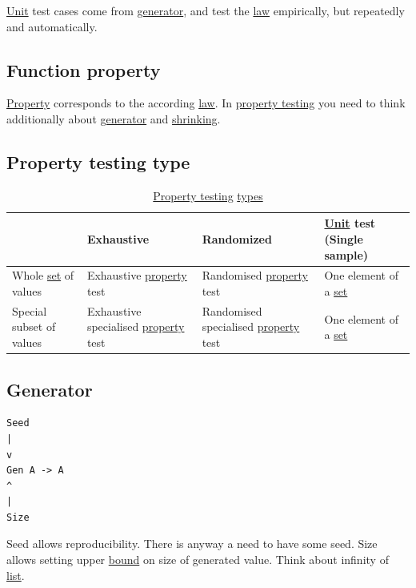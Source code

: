 \documentclass[a4paper,14pt,oneside]{book}
\begin{document}
\hyperref[org0016cda]{Unit} test cases come from \hyperref[org29306eb]{generator}, and test the \hyperref[org0354a37]{law} empirically, but repeatedly and automatically.

\subsection{\label{org5432163}Function property}
\label{sec:orgd51fe79}

\hyperref[orgbfedd9a]{Property} corresponds to the according \hyperref[org0354a37]{law}.
In \hyperref[org741dbd3]{property testing} you need to think additionally about \hyperref[org29306eb]{generator} and \hyperref[orgfdb0c80]{shrinking}.

\subsection{\label{org6c72ebe}Property testing type}
\label{sec:orgda78947}

\begin{table}[htbp]
\caption{\label{tab--property-testing-type}\hyperref[org741dbd3]{Property testing} \hyperref[orgc4edbaa]{types}}
\centering
\begin{tabu} spread \linewidth {llll}
\toprule
 & Exhaustive & Randomized & \hyperref[org0016cda]{Unit} test (Single sample)\\
\midrule
Whole \hyperref[org8d6310c]{set} of values & Exhaustive \hyperref[orgbfedd9a]{property} test & Randomised \hyperref[orgbfedd9a]{property} test & One element of a \hyperref[org8d6310c]{set}\\
Special subset of values & Exhaustive specialised \hyperref[orgbfedd9a]{property} test & Randomised specialised \hyperref[orgbfedd9a]{property} test & One element of a \hyperref[org8d6310c]{set}\\
\bottomrule
\end{tabu}
\end{table}

\subsection{\label{org29306eb}Generator}
\label{sec:org880d8f7}
\begin{verbatim}
Seed
|
v
Gen A -> A
^
|
Size
\end{verbatim}

Seed allows reproducibility.
There is anyway a need to have some seed.
Size allows setting upper \hyperref[org42d32e3]{bound} on size of generated value. Think about infinity of \hyperref[org4f1d7eb]{list}.
\end{document}
